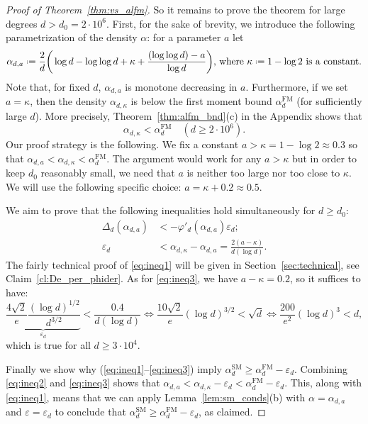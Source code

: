 \documentclass[12pt]{amsart}
\theoremstyle{definition}
\newcommand\al{\alpha}
\newcommand\De{\Delta}
\newcommand\eps{\varepsilon}
\newcommand\ka{\kappa}
\newcommand\alfm{\alpha^{\mathrm{FM}}}
\newcommand\alsm{\alpha^{\mathrm{SM}}}
\newcommand{\defeq}{\mathrel{\vcenter{\baselineskip0.5ex \lineskiplimit0pt
                     \hbox{\scriptsize.}\hbox{\scriptsize.}}}%
                     =}
\begin{document}
\begin{proof}[Proof of Theorem~\ref{thm:vs_alfm}]
So it remains to prove the theorem for large degrees $d>d_0=2 \cdot 10^6$. First, for the sake of brevity, we introduce the following parametrization of the density $\al$: for a parameter $a$ let
%
\begin{equation} \label{eq:al_a}
\al_{d,a} \defeq 
\frac{2}{d}\bigg( \log d - \log\log d 
+ \ka + \frac{(\log\log d) - a}{\log d} \bigg) 
\text{, where } \ka \defeq 1-\log 2 \text{ is a constant.}
\end{equation} 
%
Note that, for fixed $d$, $\al_{d,a}$ is monotone decreasing in $a$. Furthermore, if we set $a=\ka$, then the density $\al_{d,\ka}$ is below the first moment bound $\alfm_d$ (for sufficiently large $d$). More precisely, Theorem~\ref{thm:alfm_bnd}(c) in the Appendix shows that 
%
\begin{equation} \label{eq:ineq2}
\al_{d,\ka} < \alfm_d 
\quad (d \geq 2 \cdot 10^6) .
\end{equation}%
%
Our proof strategy is the following. We fix a constant $a>\ka=1-\log 2 \approx 0.3$ so that $\al_{d,a} < \al_{d,\ka} < \alfm_d$. The argument would work for any $a>\ka$ but in order to keep $d_0$ reasonably small, we need that $a$ is neither too large nor too close to $\ka$. We will use the following specific choice: $a=\ka+0.2 \approx 0.5$.

We aim to prove that the following inequalities hold simultaneously for $d \geq d_0$: 
%
\begin{align}
\De_d(\al_{d,a}) &< -\varphi'_d(\al_{d,a}) \eps_d ;
\label{eq:ineq1} \\
\eps_d &< \al_{d,\ka}-\al_{d,a} 
= \frac{2(a-\ka)}{d(\log d)} .
\label{eq:ineq3} 
\end{align}
%
The fairly technical proof of \eqref{eq:ineq1} will be given in Section~\ref{sec:technical}, see Claim~\ref{cl:De_per_phider}. As for \eqref{eq:ineq3}, we have $a-\ka=0.2$, so it suffices to have:
%
\[ \underbrace{\frac{4\sqrt{2}}{e} \frac{(\log d)^{1/2}}{d^{3/2}}}_{\eps_d} < \frac{0.4}{d (\log d)} 
\Longleftrightarrow 
\frac{10\sqrt{2}}{e} (\log d)^{3/2} < \sqrt{d} 
\Longleftrightarrow 
\frac{200}{e^2} (\log d)^{3} < d ,\]
%
which is true for all $d \geq 3 \cdot 10^4$.

Finally we show why (\ref{eq:ineq1}--\ref{eq:ineq3}) imply $\alsm_d \geq \alfm_d - \eps_d$. Combining \eqref{eq:ineq2} and \eqref{eq:ineq3} shows that $\al_{d,a}< \al_{d,\ka}-\eps_d <\alfm_d-\eps_d$. This, along with \eqref{eq:ineq1}, means that we can apply Lemma~\ref{lem:sm_conds}(b) with $\al=\al_{d,a}$ and $\eps=\eps_d$ to conclude that $\alsm_d \geq \alfm_d-\eps_d$, as claimed.
\end{proof}
%
\end{document}
